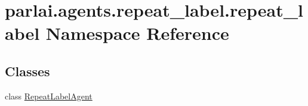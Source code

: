 \hypertarget{namespaceparlai_1_1agents_1_1repeat__label_1_1repeat__label}{}\section{parlai.\+agents.\+repeat\+\_\+label.\+repeat\+\_\+label Namespace Reference}
\label{namespaceparlai_1_1agents_1_1repeat__label_1_1repeat__label}
\subsection*{Classes}
\begin{DoxyCompactItemize}
\item 
class \hyperlink{classparlai_1_1agents_1_1repeat__label_1_1repeat__label_1_1RepeatLabelAgent}{Repeat\+Label\+Agent}
\end{DoxyCompactItemize}
